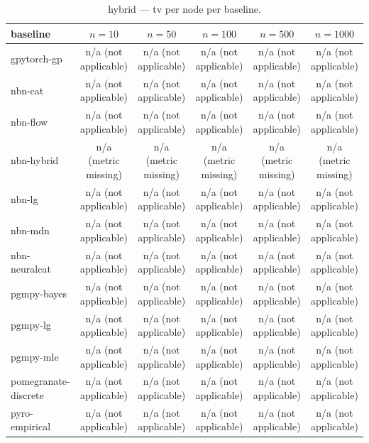 \begin{table}[h]
\centering
\caption{hybrid — tv per node per baseline.}
\label{tab:hybrid_tv_per_node}
\begin{tabular}{lccccc}
\toprule
baseline & $n=10$ & $n=50$ & $n=100$ & $n=500$ & $n=1000$ \\
\midrule
gpytorch-gp & n/a (not applicable) & n/a (not applicable) & n/a (not applicable) & n/a (not applicable) & n/a (not applicable) \\
nbn-cat & n/a (not applicable) & n/a (not applicable) & n/a (not applicable) & n/a (not applicable) & n/a (not applicable) \\
nbn-flow & n/a (not applicable) & n/a (not applicable) & n/a (not applicable) & n/a (not applicable) & n/a (not applicable) \\
nbn-hybrid & n/a (metric missing) & n/a (metric missing) & n/a (metric missing) & n/a (metric missing) & n/a (metric missing) \\
nbn-lg & n/a (not applicable) & n/a (not applicable) & n/a (not applicable) & n/a (not applicable) & n/a (not applicable) \\
nbn-mdn & n/a (not applicable) & n/a (not applicable) & n/a (not applicable) & n/a (not applicable) & n/a (not applicable) \\
nbn-neuralcat & n/a (not applicable) & n/a (not applicable) & n/a (not applicable) & n/a (not applicable) & n/a (not applicable) \\
pgmpy-bayes & n/a (not applicable) & n/a (not applicable) & n/a (not applicable) & n/a (not applicable) & n/a (not applicable) \\
pgmpy-lg & n/a (not applicable) & n/a (not applicable) & n/a (not applicable) & n/a (not applicable) & n/a (not applicable) \\
pgmpy-mle & n/a (not applicable) & n/a (not applicable) & n/a (not applicable) & n/a (not applicable) & n/a (not applicable) \\
pomegranate-discrete & n/a (not applicable) & n/a (not applicable) & n/a (not applicable) & n/a (not applicable) & n/a (not applicable) \\
pyro-empirical & n/a (not applicable) & n/a (not applicable) & n/a (not applicable) & n/a (not applicable) & n/a (not applicable) \\
\bottomrule
\end{tabular}
\end{table}

